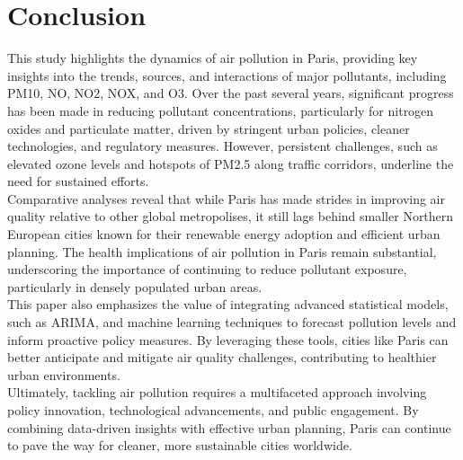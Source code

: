 \documentclass{modeleRapport}
\begin{document}
\newpage
\section{Conclusion}

This study highlights the dynamics of air pollution in Paris, providing key insights into the trends, sources, and interactions 
of major pollutants, including PM10, NO, NO2, NOX, and O3. Over the past several years, significant progress has been made 
in reducing pollutant concentrations, particularly for nitrogen oxides and particulate matter, driven by stringent urban 
policies, cleaner technologies, and regulatory measures. However, persistent challenges, such as elevated ozone 
levels and hotspots of PM2.5 along traffic corridors, underline the need for sustained efforts.\\

Comparative analyses reveal that while Paris has made strides in improving air quality relative to other 
global metropolises, it still lags behind smaller Northern European cities known for their renewable energy adoption 
and efficient urban planning. The health implications of air pollution in Paris remain substantial, underscoring the 
importance of continuing to reduce pollutant exposure, particularly in densely populated urban areas.\\

This paper also emphasizes the value of integrating advanced statistical models, such as ARIMA, and 
machine learning techniques to forecast pollution levels and inform proactive policy measures. By leveraging these tools, 
cities like Paris can better anticipate and mitigate air quality challenges, contributing to healthier urban environments.\\

Ultimately, tackling air pollution requires a multifaceted approach involving policy innovation, technological advancements, 
and public engagement. By combining data-driven insights with effective urban planning, Paris can continue to pave 
the way for cleaner, more sustainable cities worldwide.\\

\newpage
\insererbiblio
\end{document}
